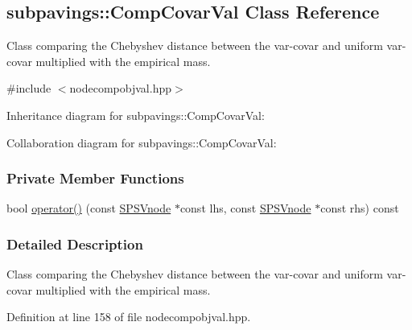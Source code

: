 \hypertarget{classsubpavings_1_1CompCovarVal}{\subsection{subpavings\-:\-:\-Comp\-Covar\-Val \-Class \-Reference}
\label{classsubpavings_1_1CompCovarVal}
}


\-Class comparing the \-Chebyshev distance between the var-\/covar and uniform var-\/covar multiplied with the empirical mass.  




{\ttfamily \#include $<$nodecompobjval.\-hpp$>$}



\-Inheritance diagram for subpavings\-:\-:\-Comp\-Covar\-Val\-:


\-Collaboration diagram for subpavings\-:\-:\-Comp\-Covar\-Val\-:
\subsubsection*{\-Private \-Member \-Functions}
\begin{DoxyCompactItemize}
\item 
bool \hyperlink{classsubpavings_1_1CompCovarVal_ac39a514e3d0b032af69ac99fe24f1dfa}{operator()} (const \hyperlink{classsubpavings_1_1SPSVnode}{\-S\-P\-S\-Vnode} $\ast$const lhs, const \hyperlink{classsubpavings_1_1SPSVnode}{\-S\-P\-S\-Vnode} $\ast$const rhs) const 
\end{DoxyCompactItemize}


\subsubsection{\-Detailed \-Description}
\-Class comparing the \-Chebyshev distance between the var-\/covar and uniform var-\/covar multiplied with the empirical mass. 

\-Definition at line 158 of file nodecompobjval.\-hpp.



